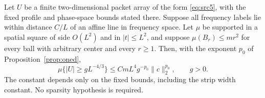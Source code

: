 \begin{proposition}\label{prop:strip}
Let $U$ be a finite two-dimensional packet array of the form
\eqref{eq:src5}, with the fixed profile and phase-space bounds stated
there.  Suppose all frequency labels lie within distance $C/L$ of an
affine line in frequency space.  Let $\mu$ be supported in a spatial
square of side $O(L^2)$ and in $|t|\leq L^2$, and suppose
$\mu(B_r)\leq mr^2$ for every ball with arbitrary center and every
$r\geq1$.  Then, with the exponent $p_0$ of
Proposition~\ref{prop:oned},
\begin{equation}\label{eq:src10}
 \mu\{|U|\geq gL^{-4/3}\}
       \leq C mL^4g^{-p_0}\|c\|_2^{p_0},\qquad g>0.
\end{equation}
The constant depends only on the fixed bounds, including the strip
width constant.  No sparsity hypothesis is required.
\end{proposition}


